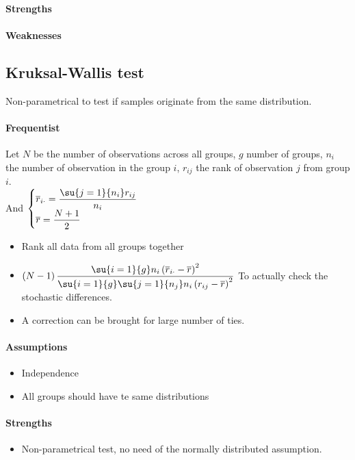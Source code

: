 \paragraph{Strengths}
\paragraph{Weaknesses}

\subsection{Kruksal-Wallis test}
Non-parametrical to test if samples originate from the same distribution.
\paragraph{Frequentist}
Let $N$ be the number of observations across all groups, $g$ number of groups, $n_{i}$ the
number of observation in the group $i$, $r_{ij}$ the rank of observation $j$ from group 
$i$.\\
And 
$\begin{cases}
    \overline{r}_{i\cdot} = \dfrac{\su{j=1}{n_{i}}r_{ij}}{n_{i}} \\
    \overline{r} = \dfrac{N + 1}{2}
\end{cases}$
\begin{itemize}
    \item Rank all data from all groups together
    \item $\left(N-1\right)\dfrac{\su{i=1}{g}n_{i}\left(\overline{r}_{i\cdot} - 
                \overline{r}\right)^{2}}{\su{i=1}{g}\su{j=1}{n_{j}}n_{i}\left(r_{ij} - 
        \overline{r}\right)^{2}}$
        To actually check the stochastic differences.
    \item A correction can be brought for large number of ties.

\end{itemize}

\paragraph{Assumptions}
\begin{itemize}
    \item Independence
    \item All groups should have te same distributions
\end{itemize}

\paragraph{Strengths}
\begin{itemize}
    \item Non-parametrical test, no need of the normally distributed assumption.
\end{itemize}


